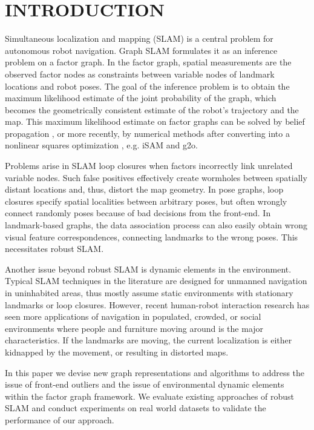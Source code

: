 \section{INTRODUCTION}

Simultaneous localization and mapping (SLAM) is a central problem for
autonomous robot navigation.  Graph SLAM formulates it as an inference problem
on a factor graph. In the factor graph, spatial measurements are the observed factor nodes as constraints between variable nodes of landmark locations and robot poses. The goal of
the inference problem is to obtain the maximum likelihood estimate of the
joint probability of the graph, which becomes the geometrically consistent
estimate of the robot's trajectory and the map. This maximum likelihood estimate on factor graphs can be solved by belief propagation , or more recently, by numerical methods after converting into a nonlinear squares optimization , e.g. iSAM\cite{isam} and g2o\cite{g2o}.

Problems arise in SLAM loop closures when factors incorrectly link unrelated variable nodes.  Such false positives effectively create wormholes between spatially distant locations and, thus, distort the map geometry. In pose graphs, loop closures specify spatial localities between arbitrary poses, but often wrongly connect randomly poses because of bad decisions from the front-end.  In landmark-based graphs, the data association process can also easily obtain wrong visual feature correspondences, connecting landmarks to the wrong poses. This necessitates robust SLAM.

Another issue beyond robust SLAM is dynamic elements in the environment.
Typical SLAM techniques in the literature are designed for unmanned navigation
in uninhabited areas, thus mostly assume static environments with stationary
landmarks or loop closures. However, recent human-robot interaction research
has seen more applications of navigation in populated, crowded, or social
environments where people and furniture moving around is the major
characteristics. If the landmarks are moving, the current localization is either
kidnapped by the movement, or resulting in distorted maps.

In this paper we devise new graph representations and algorithms to
address the issue of front-end outliers and the issue of environmental
dynamic elements within the factor graph framework. We evaluate existing
approaches of robust SLAM and conduct experiments on real world datasets to
validate the performance of our approach.
